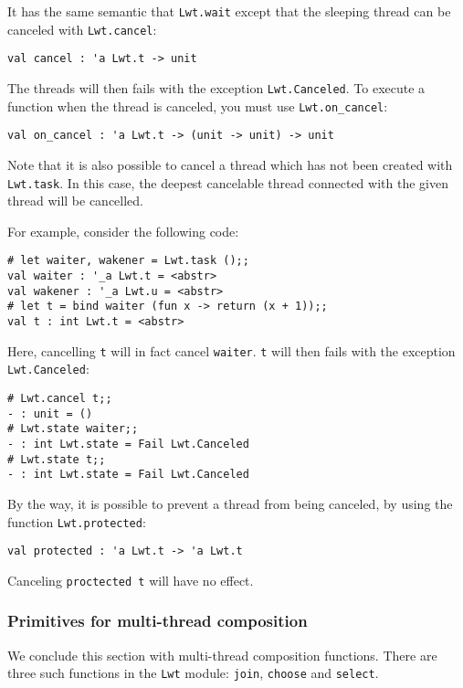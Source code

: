 \documentclass{article}
\newcommand{\lwt}{\texttt{Lwt}\xspace}
\begin{document}
It has the same semantic that \texttt{Lwt.wait} except that the
sleeping thread can be canceled with \texttt{Lwt.cancel}:

\begin{verbatim}
val cancel : 'a Lwt.t -> unit
\end{verbatim}

The threads will then fails with the exception
\texttt{Lwt.Canceled}. To execute a function when the thread is
canceled, you must use \texttt{Lwt.on\_cancel}:

\begin{verbatim}
val on_cancel : 'a Lwt.t -> (unit -> unit) -> unit
\end{verbatim}

Note that it is also possible to cancel a thread which has not been
created with \texttt{Lwt.task}. In this case, the deepest cancelable
thread connected with the given thread will be cancelled.

For example, consider the following code:

\begin{verbatim}
# let waiter, wakener = Lwt.task ();;
val waiter : '_a Lwt.t = <abstr>
val wakener : '_a Lwt.u = <abstr>
# let t = bind waiter (fun x -> return (x + 1));;
val t : int Lwt.t = <abstr>
\end{verbatim}

Here, cancelling \texttt{t} will in fact cancel \texttt{waiter}.
\texttt{t} will then fails with the exception \texttt{Lwt.Canceled}:

\begin{verbatim}
# Lwt.cancel t;;
- : unit = ()
# Lwt.state waiter;;
- : int Lwt.state = Fail Lwt.Canceled
# Lwt.state t;;
- : int Lwt.state = Fail Lwt.Canceled
\end{verbatim}

By the way, it is possible to prevent a thread from being canceled, by
using the function \texttt{Lwt.protected}:

\begin{verbatim}
val protected : 'a Lwt.t -> 'a Lwt.t
\end{verbatim}

Canceling \texttt{proctected t} will have no effect.

\subsubsection{Primitives for multi-thread composition}

We conclude this section with multi-thread composition functions. There
are three such functions in the \lwt module: \texttt{join},
\texttt{choose} and \texttt{select}.
\end{document}
